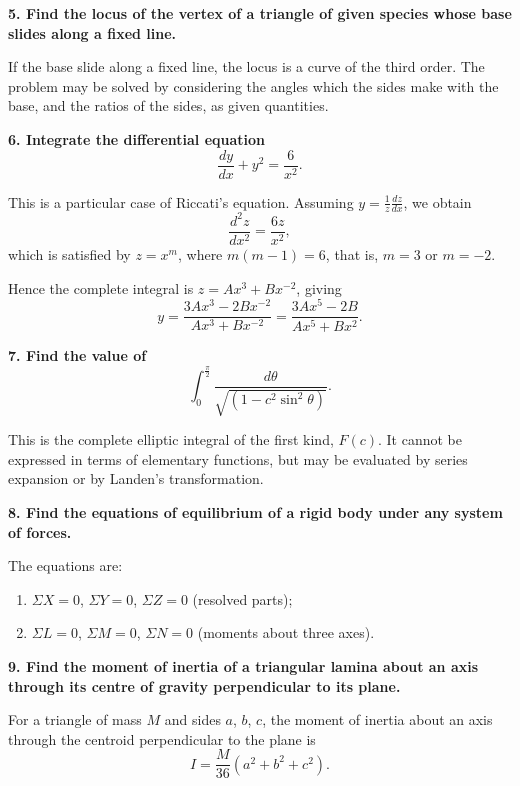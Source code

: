 \documentclass[11pt,a4paper]{book}
\begin{document}
\smallskip

\noindent\textbf{5. Find the locus of the vertex of a triangle of given species whose base slides along a fixed line.}

If the base slide along a fixed line, the locus is a curve of the third order. The problem may be solved by considering the angles which the sides make with the base, and the ratios of the sides, as given quantities.

\smallskip

\noindent\textbf{6. Integrate the differential equation}
\[
\frac{dy}{dx} + y^2 = \frac{6}{x^2}.
\]

This is a particular case of Riccati's equation. Assuming $y = \frac{1}{z} \frac{dz}{dx}$, we obtain
\[
\frac{d^2z}{dx^2} = \frac{6z}{x^2},
\]
which is satisfied by $z = x^m$, where $m(m-1) = 6$, that is, $m = 3$ or $m = -2$.

Hence the complete integral is $z = Ax^3 + Bx^{-2}$, giving
\[
y = \frac{3Ax^3 - 2Bx^{-2}}{Ax^3 + Bx^{-2}} = \frac{3Ax^5 - 2B}{Ax^5 + Bx^2}.
\]

\smallskip

\noindent\textbf{7. Find the value of}
\[
\int_0^{\frac{\pi}{2}} \frac{d\theta}{\sqrt{(1 - c^2 \sin^2 \theta)}}.
\]

This is the complete elliptic integral of the first kind, $F(c)$. It cannot be expressed in terms of elementary functions, but may be evaluated by series expansion or by Landen's transformation.

\smallskip

\noindent\textbf{8. Find the equations of equilibrium of a rigid body under any system of forces.}

The equations are:
\begin{enumerate}[label=(\alph*)]
\item $\Sigma X = 0$, $\Sigma Y = 0$, $\Sigma Z = 0$ (resolved parts);
\item $\Sigma L = 0$, $\Sigma M = 0$, $\Sigma N = 0$ (moments about three axes).
\end{enumerate}

\smallskip

\noindent\textbf{9. Find the moment of inertia of a triangular lamina about an axis through its centre of gravity perpendicular to its plane.}

For a triangle of mass $M$ and sides $a$, $b$, $c$, the moment of inertia about an axis through the centroid perpendicular to the plane is
\[
I = \frac{M}{36}(a^2 + b^2 + c^2).
\]
\end{document}
